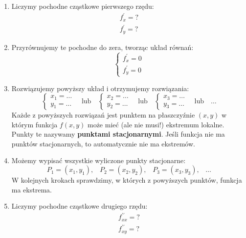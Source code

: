\begin{enumerate}[itemsep=0pt,partopsep=0pt, parsep=0pt]
    \item Liczymy pochodne cząstkowe pierwszego rzędu:
    \[
        \begin{matrix}
            f^{\prime}_x=? \\
            f^{\prime}_y=?
        \end{matrix}
    \]
    \item Przyrównujemy te pochodne do zera, tworząc układ równań:
    \[
        \left\{\begin{matrix}
                   f^{\prime}_x=0 \\
                   f^{\prime}_y=0
        \end{matrix}\right.
    \]
    \item Rozwiązujemy powyższy układ i otrzymujemy rozwiązania:
    \[
        \left\{\begin{matrix}
                   x_1= \dots \\ y_1= \dots
        \end{matrix}\right.
        \quad
        \text{lub}
        \quad
        \left\{\begin{matrix}
                   x_2= \dots \\ y_2= \dots
        \end{matrix}\right.
        \quad
        \text{lub}
        \quad
        \left\{\begin{matrix}
                   x_3= \dots \\ y_3= \dots
        \end{matrix}\right.
        \quad
        \text{lub}
        \quad
        \ldots
    \]
    Każde z powyższych rozwiązań jest punktem na płaszczyźnie $(x,y)$ w którym funkcja $f(x,y)$
    może mieć (ale nie musi!) ekstremum lokalne.
    Punkty te nazywamy \textbf{punktami stacjonarnymi}.
    Jeśli funkcja nie ma punktów stacjonarnych, to automatycznie nie ma ekstremów.
    \item Możemy wypisać wszystkie wyliczone punkty stacjonarne:
    \[
        P_1=(x_1,y_1)\text{,}\quad P_2=(x_2,y_2)\text{,}\quad P_3=(x_3,y_3)\text{,}\quad \dots
    \]
    W kolejnych krokach sprawdzimy, w których z powyższych punktów, funkcja ma ekstrema.
    \item Liczymy pochodne cząstkowe drugiego rzędu:
    \[
        \begin{matrix}
            f^{\prime\prime}_{xx}=? \\
            f^{\prime\prime}_{xy}=? \\

\end{matrix}\]
\end{enumerate}
